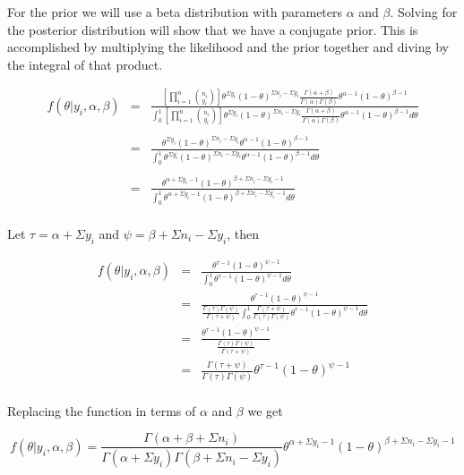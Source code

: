 \documentclass[12pt]{article}
\begin{document}
\noindent For the prior we will use a beta distribution with parameters $\alpha$ and $\beta$.  Solving for the posterior distribution will show that we have a conjugate prior.  This is accomplished by multiplying the likelihood and the prior together and diving by the integral of that product.

\begin{eqnarray*}
f(\theta|y_i,\alpha,\beta) &=& \frac{\left[\prod_{i=1}^n{n_i \choose y_i}\right]\theta^{\Sigma y_i}(1-\theta)^{\Sigma n_i-\Sigma y_i}\frac{\Gamma(\alpha+\beta)}{\Gamma(\alpha)\Gamma(\beta)}\theta^{\alpha-1}(1-\theta)^{\beta-1}}{\int_0^1\left[\prod_{i=1}^n{n_i \choose y_i}\right]\theta^{\Sigma y_i}(1-\theta)^{\Sigma n_i-\Sigma y_i}\frac{\Gamma(\alpha+\beta)}{\Gamma(\alpha)\Gamma(\beta)}\theta^{\alpha-1}(1-\theta)^{\beta-1}d\theta}  \\
\\
&=& \frac{\theta^{\Sigma y_i}(1-\theta)^{\Sigma n_i-\Sigma y_i}\theta^{\alpha-1}(1-\theta)^{\beta-1}}{\int_0^1\theta^{\Sigma y_i}(1-\theta)^{\Sigma n_i-\Sigma y_i}\theta^{\alpha-1}(1-\theta)^{\beta-1}d\theta} \\
\\
&=& \frac{\theta^{\alpha+\Sigma y_i-1}(1-\theta)^{\beta+\Sigma n_i-\Sigma y_i-1}}{\int_0^1\theta^{\alpha+\Sigma y_i-1}(1-\theta)^{\beta+\Sigma n_i-\Sigma y_i-1}d\theta} \\
\end{eqnarray*}

\noindent Let $\tau=\alpha+\Sigma y_i$ and $\psi=\beta+\Sigma n_i-\Sigma y_i$, then

\begin{eqnarray*}
f(\theta|y_i,\alpha,\beta) &=& \frac{\theta^{\tau-1}(1-\theta)^{\psi-1}}{\int_0^1\theta^{\tau-1}(1-\theta)^{\psi-1}d\theta} \\
&=& \frac{\theta^{\tau-1}(1-\theta)^{\psi-1}}{\frac{\Gamma(\tau)\Gamma(\psi)}{\Gamma(\tau+\psi)}\int_0^1\frac{\Gamma(\tau+\psi)}{\Gamma(\tau)\Gamma(\psi)}\theta^{\tau-1}(1-\theta)^{\psi-1}d\theta} \\
&=& \frac{\theta^{\tau-1}(1-\theta)^{\psi-1}}{\frac{\Gamma(\tau)\Gamma(\psi)}{\Gamma(\tau+\psi)}} \\
&=& \frac{\Gamma(\tau+\psi)}{\Gamma(\tau)\Gamma(\psi)}\theta^{\tau-1}(1-\theta)^{\psi-1} \\
\end{eqnarray*}

\noindent Replacing the function in terms of $\alpha$ and $\beta$ we get

\[f(\theta|y_i,\alpha,\beta)=\frac{\Gamma(\alpha+\beta+\Sigma n_i)}{\Gamma(\alpha+\Sigma y_i)\Gamma(\beta+\Sigma n_i-\Sigma y_i)}\theta^{\alpha+\Sigma y_i-1}(1-\theta)^{\beta+\Sigma n_i-\Sigma y_i-1}\]
\end{document}
